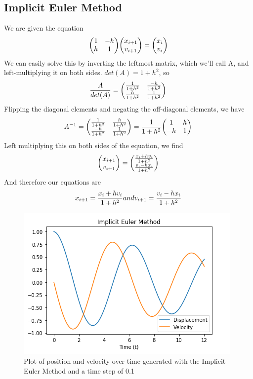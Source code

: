 \documentclass{article}
\begin{document}
\subsection{Implicit Euler Method}

We are given the equation 
$$
    \mqty(1 & -h \\ h & 1) \mqty(x_{i+1} \\ v_{i+1}) = \mqty(x_{i} \\ v_{i})
$$
We can easily solve this by inverting the leftmost matrix, which we'll call A, and left-multiplying it on both sides. $det(A) = 1 +h^2$, so 
$$
\frac{A}{det(A)} = \mqty(\frac{1}{1 + h^2} & \frac{-h}{1 + h^2} \\ \frac{h}{1 + h^2} & \frac{1}{1 + h^2})
$$
Flipping the diagonal elements and negating the off-diagonal elements, we have
$$
A^{-1} = \mqty(\frac{1}{1 + h^2} & \frac{h}{1 + h^2} \\ \frac{-h}{1 + h^2} & \frac{1}{1 + h^2}) = \frac{1}{1 + h^2} \mqty(1 & h \\ -h & 1)
$$
Left multiplying this on both sides of the equation, we find
$$
\mqty(x_{i+1} \\ v_{i+1}) = \mqty(\frac{x_{i} + h v_{i}}{1 + h^2} \\ \frac{v_{i} - h x_{i}}{1 + h^2})
$$
And therefore our equations are
$$
x_{i+1} = \frac{x_{i} + h v_{i}}{1 + h^2} \space and \space v_{i+1} = \frac{v_{i} - h x_{i}}{1 + h^2}
$$

\begin{figure}[h!]
\centering
\includegraphics[scale=0.35]{imp_euler.png}
\caption{Plot of position and velocity over time generated with the Implicit Euler Method and a time step of 0.1}
\label{fig:impeuler}
\end{figure}
\end{document}
